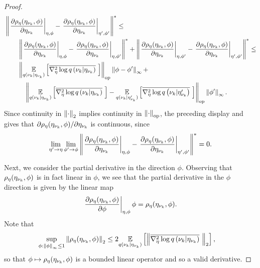 \begin{thm}
\begin{proof}
%
\begin{align*}
%
\MoveEqLeft
%
\norm{\fracat{\partial \rho_\eta(\etanuk, \phi)}{\partial \etanuk}{\eta, \phi} -
      \fracat{\partial \rho_\eta(\etanuk, \phi)}{\partial \etanuk}{\eta', \phi'}
      }^* \le \\
%
& \norm{\fracat{\partial \rho_\eta(\etanuk, \phi)}{\partial \etanuk}{\eta, \phi} -
        \fracat{\partial \rho_\eta(\etanuk, \phi)}{\partial \etanuk}{\eta, \phi'}
    }^* +
\norm{\fracat{\partial \rho_\eta(\etanuk, \phi)}{\partial \etanuk}{\eta, \phi'} -
      \fracat{\partial \rho_\eta(\etanuk, \phi)}{\partial \etanuk}{\eta', \phi'}
    }^* \le \\
%
& \normop{
    \expect{\q(\nuk \vert \etanuk)}
           {\lqhessbar{\nuk \vert \etanuk}}
    } \norminf{\phi - \phi'} + \\&\quad
\normop{
    \expect{\q(\nuk \vert \etanuk)}{\lqhessbar{\nuk \vert \etanuk}} -
    \expect{\q(\nuk \vert \etanuk')}{\lqhessbar{\nuk \vert \etanuk'}}
  } \norminf{\phi'}.
%
\end{align*}
%
Since continuity in $\left\Vert\cdot\right\Vert_2$ implies continuity in $\left\Vert\cdot\right\Vert_{\mathrm{op}}$,
the preceding display and  gives that
$\partial \rho_\eta(\eta_{\nu_{k}}, \phi) / \partial \eta_{\nu_{k}}$ is continuous,
since
%
\begin{align*}
%
\lim_{\eta' \rightarrow \eta} \lim_{\phi' \rightarrow \phi}
\norm{\fracat{\partial \rho_\eta(\etanuk, \phi)}{\partial \etanuk}{\eta, \phi} -
      \fracat{\partial \rho_\eta(\etanuk, \phi)}{\partial \etanuk}{\eta', \phi'}
      }^* = 0.
%
\end{align*}

Next, we consider the partial derivative in the direction $\phi$.  Observing
that $\rho_\eta(\eta_{\nu_{k}}, \phi)$ is in fact linear in $\phi$, we see that the
partial derivative in the $\phi$ direction is given by the linear map
%
\begin{align*}
%
\fracat{\partial \rho_\eta(\etanuk, \phi)}{\partial \phi}{\eta, \phi} \phi =
    \rho_\eta(\etanuk, \phi).
%
\end{align*}
%
Note that
%
\begin{align*}
%
\sup_{\phi: \norminf{\phi} \le 1} \norm{\rho_\eta(\etanuk, \phi)}_2 \le{}&
    2 \expect{\q(\nuk \vert \etanuk)}
             {\norm{\lqhessbar{\nuk \vert \etanuk}}_2
             },
%
\end{align*}
%
so that $\phi \mapsto \rho_\eta(\eta_{\nu_{k}}, \phi)$ is a bounded linear operator and so
a valid derivative.


\end{proof}
\end{thm}
